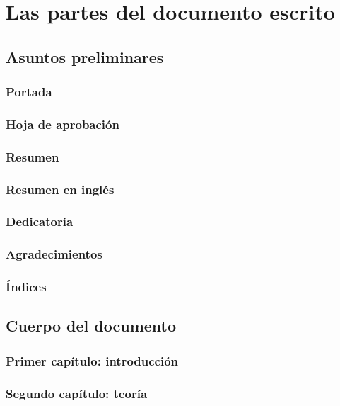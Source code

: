 \section{Las partes del documento escrito}

\subsection{Asuntos preliminares}

\subsubsection{Portada}

\subsubsection{Hoja de aprobación}

\subsubsection{Resumen}

\subsubsection{Resumen en inglés}

\subsubsection{Dedicatoria}

\subsubsection{Agradecimientos}

\subsubsection{Índices}

\subsection{Cuerpo del documento}

\subsubsection{Primer capítulo: introducción}

\subsubsection{Segundo capítulo: teoría}

